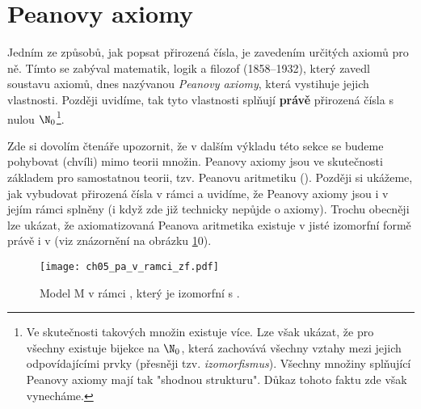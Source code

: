 \section{Peanovy axiomy}\label{sec:peanovy_axiomy}
Jedním ze způsobů, jak popsat přirozená čísla, je zavedením určitých axiomů pro ně. Tímto se zabýval matematik, logik a filozof  (1858--1932), který zavedl soustavu axiomů, dnes nazývanou \emph{Peanovy axiomy}, která vystihuje jejich vlastnosti. Později uvidíme, tak tyto vlastnosti splňují \textbf{právě} přirozená čísla s nulou $\N_0$\footnote{Ve skutečnosti takových množin existuje více. Lze však ukázat, že pro všechny existuje bijekce na $\N_0$, která zachovává všechny vztahy mezi jejich odpovídajícími prvky (přesněji tzv. \emph{izomorfismus}). Všechny množiny splňující Peanovy axiomy mají tak "shodnou strukturu". Důkaz tohoto faktu zde však vynecháme.}.\par
Zde si dovolím čtenáře upozornit, že v dalším výkladu této sekce se budeme pohybovat (chvíli) mimo teorii množin. Peanovy axiomy jsou ve skutečnosti základem pro samostatnou teorii, tzv. Peanovu aritmetiku (\PA). Později si ukážeme, jak vybudovat přirozená čísla v rámci \ZF{} a uvidíme, že Peanovy axiomy jsou i v jejím rámci splněny (i když zde již technicky nepůjde o axiomy). Trochu obecněji lze ukázat, že axiomatizovaná Peanova aritmetika existuje v jisté izomorfní formě právě i v \ZF{} (viz znázornění na obrázku \ref{fig:pa_v_ramci_zf}0).
\begin{figure}[H]
    \centering
    \texttt{[image: ch05\_pa\_v\_ramci\_zf.pdf]}
    \caption{Model \textsf{M} v rámci \ZF{}, který je izomorfní s \PA.}
    \label{fig:pa_v_ramci_zf}
\end{figure}
\medskip

